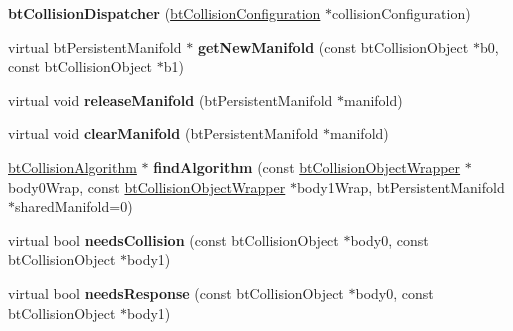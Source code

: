 \begin{DoxyCompactItemize}
\item 
\hypertarget{classbt_collision_dispatcher_a4d71913fba02e45b4cfcba7178930d25}{{\bfseries bt\+Collision\+Dispatcher} (\hyperlink{classbt_collision_configuration}{bt\+Collision\+Configuration} $\ast$collision\+Configuration)}\label{classbt_collision_dispatcher_a4d71913fba02e45b4cfcba7178930d25}

\item 
\hypertarget{classbt_collision_dispatcher_a6072f704bd135be21afb3750033b9325}{virtual bt\+Persistent\+Manifold $\ast$ {\bfseries get\+New\+Manifold} (const bt\+Collision\+Object $\ast$b0, const bt\+Collision\+Object $\ast$b1)}\label{classbt_collision_dispatcher_a6072f704bd135be21afb3750033b9325}

\item 
\hypertarget{classbt_collision_dispatcher_a1b5d70402440fe3f765cac14adad6b22}{virtual void {\bfseries release\+Manifold} (bt\+Persistent\+Manifold $\ast$manifold)}\label{classbt_collision_dispatcher_a1b5d70402440fe3f765cac14adad6b22}

\item 
\hypertarget{classbt_collision_dispatcher_a8b8823eec6581403c1ba8de0bae2615a}{virtual void {\bfseries clear\+Manifold} (bt\+Persistent\+Manifold $\ast$manifold)}\label{classbt_collision_dispatcher_a8b8823eec6581403c1ba8de0bae2615a}

\item 
\hypertarget{classbt_collision_dispatcher_a91cf0ae80a9d1ee29daf550d44677c0e}{\hyperlink{classbt_collision_algorithm}{bt\+Collision\+Algorithm} $\ast$ {\bfseries find\+Algorithm} (const \hyperlink{structbt_collision_object_wrapper}{bt\+Collision\+Object\+Wrapper} $\ast$body0\+Wrap, const \hyperlink{structbt_collision_object_wrapper}{bt\+Collision\+Object\+Wrapper} $\ast$body1\+Wrap, bt\+Persistent\+Manifold $\ast$shared\+Manifold=0)}\label{classbt_collision_dispatcher_a91cf0ae80a9d1ee29daf550d44677c0e}

\item 
\hypertarget{classbt_collision_dispatcher_a3287aa0446d7fbf56623fa53c87fd586}{virtual bool {\bfseries needs\+Collision} (const bt\+Collision\+Object $\ast$body0, const bt\+Collision\+Object $\ast$body1)}\label{classbt_collision_dispatcher_a3287aa0446d7fbf56623fa53c87fd586}

\item 
\hypertarget{classbt_collision_dispatcher_a99cc46cf534f493e6f91b2a1e2aeb0bb}{virtual bool {\bfseries needs\+Response} (const bt\+Collision\+Object $\ast$body0, const bt\+Collision\+Object $\ast$body1)}\label{classbt_collision_dispatcher_a99cc46cf534f493e6f91b2a1e2aeb0bb}


\end{DoxyCompactItemize}
